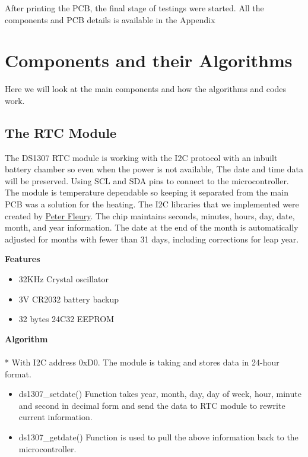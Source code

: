 After printing the PCB, the final stage of testings were started. All the components and PCB details is available in the Appendix

\section{Components and their Algorithms}

Here we will look at the main components and how the algorithms and codes work.

\subsection{The RTC Module}

The DS1307 RTC module is working with the I2C protocol with an inbuilt battery chamber so even when the power is not available, The date and time data will be preserved. Using SCL and SDA pins to connect to the microcontroller. The module is temperature dependable so keeping it separated from the main PCB was a solution for the heating. The I2C libraries that we implemented were created by \href{http://jump.to/fleury}{Peter Fleury}. The chip maintains seconds, minutes, hours, day, date, month, and year information. The date at the end of the month is automatically adjusted for months with fewer than 31 days, including corrections for leap year.

\Large \textbf{Features}
\normalsize
\begin{itemize}
  \item 32KHz Crystal oscillator 
  \item 3V CR2032 battery backup
  \item 32 bytes 24C32 EEPROM	
\end{itemize}
\Large \textbf{Algorithm}\\[0.1cm]
\\*
\normalsize{With I2C address 0xD0. The module is taking and stores data in 24-hour format.}
\begin{itemize}
  \item ds1307\_setdate() Function takes year, month, day, day of week, hour, minute and second in decimal form and send the data to RTC module to rewrite current information. 
  \item ds1307\_getdate() Function is used to pull the above information back to the microcontroller.
\end{itemize}


